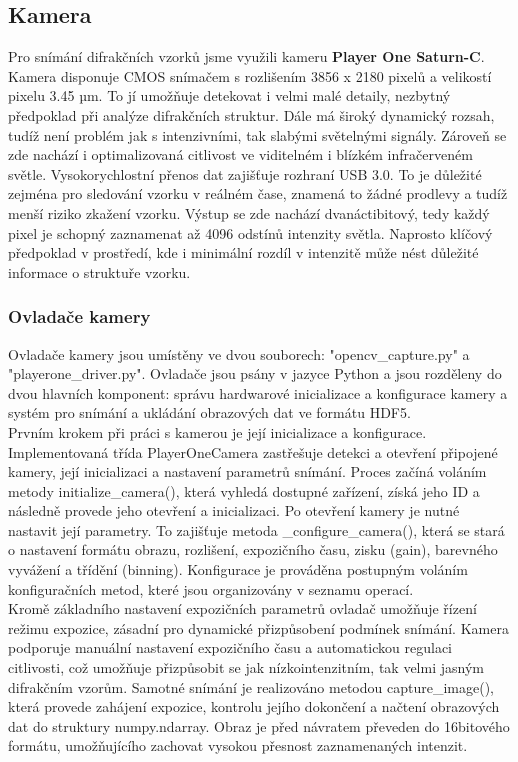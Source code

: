 \documentclass[a4paper]{article}
\begin{document}
\subsection{Kamera}
Pro snímání difrakčních vzorků jsme využili kameru \textbf{Player One Saturn-C}. Kamera disponuje CMOS snímačem s rozlišením 3856 x 2180 pixelů a velikostí pixelu 3.45 µm. To jí umožňuje detekovat i velmi malé detaily, nezbytný předpoklad při analýze difrakčních struktur.
    Dále má široký dynamický rozsah, tudíž není problém jak s intenzivními, tak slabými světelnými signály. Zároveň se zde nachází i optimalizovaná citlivost ve viditelném i blízkém infračerveném světle.
    Vysokorychlostní přenos dat zajišťuje rozhraní USB 3.0. To je důležité zejména pro sledování vzorku v reálném čase, znamená to žádné prodlevy a tudíž menší riziko zkažení vzorku.
    Výstup se zde nachází dvanáctibitový, tedy každý pixel je schopný zaznamenat až 4096 odstínů intenzity světla. Naprosto klíčový předpoklad v prostředí, kde i minimální rozdíl v intenzitě může nést důležité informace o struktuře vzorku.

\subsubsection{Ovladače kamery}
 Ovladače kamery jsou umístěny ve dvou souborech: "opencv\_capture.py" a "playerone\_driver.py". Ovladače jsou psány v jazyce Python a jsou rozděleny do dvou hlavních komponent: správu hardwarové inicializace a konfigurace kamery a systém pro snímání a ukládání obrazových dat ve formátu HDF5.\\

    Prvním krokem při práci s kamerou je její inicializace a konfigurace. Implementovaná třída PlayerOneCamera zastřešuje detekci a otevření připojené kamery, její inicializaci a nastavení parametrů snímání. Proces začíná voláním metody initialize\_camera(), která vyhledá dostupné zařízení, získá jeho ID a následně provede jeho otevření a inicializaci. Po otevření kamery je nutné nastavit její parametry. To zajišťuje metoda \_configure\_camera(), která se stará o nastavení formátu obrazu, rozlišení, expozičního času, zisku (gain), barevného vyvážení a třídění (binning). Konfigurace je prováděna postupným voláním konfiguračních metod, které jsou organizovány v seznamu operací.\\

    Kromě základního nastavení expozičních parametrů ovladač umožňuje řízení režimu expozice, zásadní pro dynamické přizpůsobení podmínek snímání. Kamera podporuje manuální nastavení expozičního času a automatickou regulaci citlivosti, což umožňuje přizpůsobit se jak nízkointenzitním, tak velmi jasným difrakčním vzorům. Samotné snímání je realizováno metodou capture\_image(), která provede zahájení expozice, kontrolu jejího dokončení a načtení obrazových dat do struktury numpy.ndarray. Obraz je před návratem převeden do 16bitového formátu, umožňujícího zachovat vysokou přesnost zaznamenaných intenzit.\\
\end{document}
